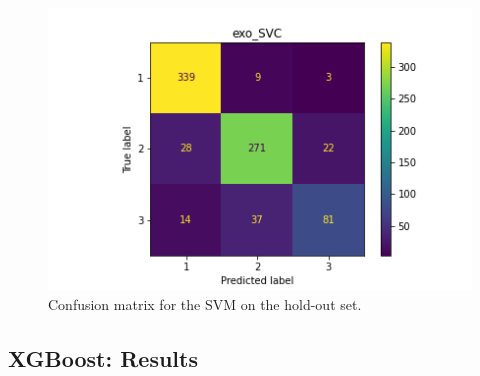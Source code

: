 \documentclass{article}
\begin{document}
\begin{figure}[H]
	\begin{center}
		\includegraphics[totalheight=6cm]{figures/exo_svc_cfmat.png}
	\end{center}
	\caption{Confusion matrix for the SVM on the hold-out set.}
\end{figure}
\subsection{XGBoost: Results}
\end{document}
